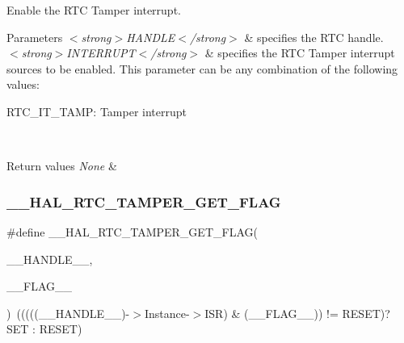Enable the R\+TC Tamper interrupt. 


\begin{DoxyParams}{Parameters}
{\em $<$strong$>$\+H\+A\+N\+D\+L\+E$<$/strong$>$} & specifies the R\+TC handle. \\
\hline
{\em $<$strong$>$\+I\+N\+T\+E\+R\+R\+U\+P\+T$<$/strong$>$} & specifies the R\+TC Tamper interrupt sources to be enabled. This parameter can be any combination of the following values\+: \begin{DoxyItemize}
\item R\+T\+C\+\_\+\+I\+T\+\_\+\+T\+A\+MP\+: Tamper interrupt \end{DoxyItemize}
\\
\hline
\end{DoxyParams}

\begin{DoxyRetVals}{Return values}
{\em None} & \\
\hline
\end{DoxyRetVals}
\mbox{\label{group___r_t_c_ex___tamper_gafc2d73770375bd10cf6e4faa11adc7b1}} 
\subsubsection{\texorpdfstring{\+\_\+\+\_\+\+H\+A\+L\+\_\+\+R\+T\+C\+\_\+\+T\+A\+M\+P\+E\+R\+\_\+\+G\+E\+T\+\_\+\+F\+L\+AG}{\_\_HAL\_RTC\_TAMPER\_GET\_FLAG}}
{\footnotesize\ttfamily \#define \+\_\+\+\_\+\+H\+A\+L\+\_\+\+R\+T\+C\+\_\+\+T\+A\+M\+P\+E\+R\+\_\+\+G\+E\+T\+\_\+\+F\+L\+AG(\begin{DoxyParamCaption}\item[{}]{\+\_\+\+\_\+\+H\+A\+N\+D\+L\+E\+\_\+\+\_\+,  }\item[{}]{\+\_\+\+\_\+\+F\+L\+A\+G\+\_\+\+\_\+ }\end{DoxyParamCaption})~(((((\+\_\+\+\_\+\+H\+A\+N\+D\+L\+E\+\_\+\+\_\+)-\/$>$Instance-\/$>$I\+SR) \& (\+\_\+\+\_\+\+F\+L\+A\+G\+\_\+\+\_\+)) != R\+E\+S\+ET)? S\+ET \+: R\+E\+S\+ET)}



